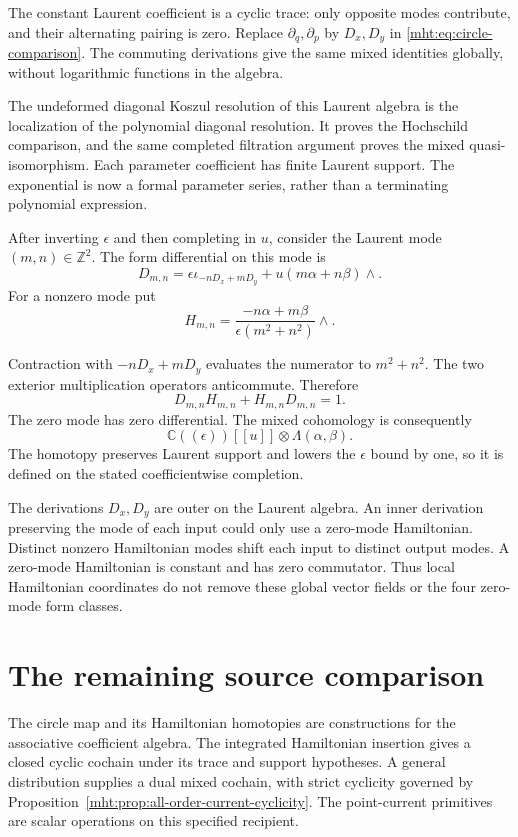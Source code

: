 The constant Laurent coefficient is a cyclic trace: only
opposite modes contribute, and their alternating pairing is
zero. Replace $\partial_q,\partial_p$ by $D_x,D_y$ in
\eqref{mht:eq:circle-comparison}.
The commuting derivations give the same mixed identities
globally, without logarithmic functions in the algebra.

The undeformed diagonal Koszul resolution of this Laurent
algebra is the localization of the polynomial diagonal
resolution. It proves the Hochschild comparison, and the
same completed filtration argument proves the mixed
quasi-isomorphism. Each parameter coefficient has finite
Laurent support. The exponential is now a formal parameter
series, rather than a terminating polynomial expression.

After inverting $\epsilon$ and then completing in $u$,
consider the Laurent mode $(m,n)\in\mathbb Z^2$.
The form differential on this mode is
\[
 D_{m,n}=\epsilon\iota_{-nD_x+mD_y}
                    +u(m\alpha+n\beta)\wedge.
\]
For a nonzero mode put
\[
 H_{m,n}=\frac{-n\alpha+m\beta}{\epsilon(m^2+n^2)}\wedge.
\]

Contraction with $-nD_x+mD_y$ evaluates the numerator to
$m^2+n^2$. The two exterior multiplication operators
anticommute. Therefore
\[
 D_{m,n}H_{m,n}+H_{m,n}D_{m,n}=1.
\]
The zero mode has zero differential. The mixed cohomology is
consequently
\begin{equation}\label{mht:eq:torus-cyclic-cohomology}
 \mathbb C((\epsilon))[[u]]\otimes\Lambda(\alpha,\beta).
\end{equation}
The homotopy preserves Laurent support and lowers the
$\epsilon$ bound by one, so it is defined on the stated
coefficientwise completion.

The derivations $D_x,D_y$ are outer on the Laurent algebra.
An inner derivation preserving the mode of each input could
only use a zero-mode Hamiltonian. Distinct nonzero Hamiltonian
modes shift each input to distinct output modes. A zero-mode Hamiltonian is
constant and has zero commutator. Thus local Hamiltonian
coordinates do not remove these global vector fields or
the four zero-mode form classes.

\section{The remaining source comparison}

The circle map and its Hamiltonian homotopies are constructions
for the associative coefficient algebra. The integrated
Hamiltonian insertion gives a closed cyclic cochain under its
trace and support hypotheses. A general distribution supplies
a dual mixed cochain, with strict cyclicity governed by
Proposition~\ref{mht:prop:all-order-current-cyclicity}.
The point-current primitives are scalar operations on this
specified recipient.

